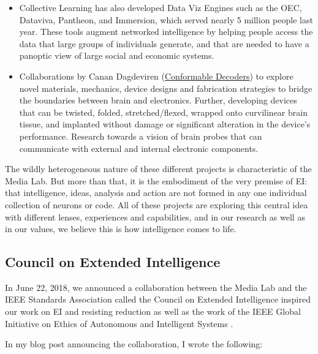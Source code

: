 \begin{itemize}
\item Collective Learning has also developed Data Viz Engines such as the OEC, Dataviva, Pantheon, and Immersion, which served nearly 5 million people last year. These tools augment networked intelligence by helping people access the data that large groups of individuals generate, and that are needed to have a panoptic view of large social and economic systems.

\item Collaborations by Canan Dagdeviren (\href{https://www.media.mit.edu/groups/conformable-decoders/overview/}{Conformable Decoders}) to explore novel materials, mechanics, device designs and fabrication strategies to bridge the boundaries between brain and electronics. Further, developing devices that can be twisted, folded, stretched/flexed, wrapped onto curvilinear brain tissue, and implanted without damage or significant alteration in the device's performance. Research towards a vision of brain probes that can communicate with external and internal electronic components.
\end{itemize}

The wildly heterogeneous nature of these different projects is characteristic of the Media Lab. But more than that, it is the embodiment of the very premise of \ac{EI}: that intelligence, ideas, analysis and action are not formed in any one individual collection of neurons or code. All of these projects are exploring this central idea with different lenses, experiences and capabilities, and in our research as well as in our values, we believe this is how intelligence comes to life.

\subsection{Council on Extended Intelligence}

In June 22, 2018, we announced a collaboration between the Media Lab and the \ac{IEEE} Standards Association called the Council on Extended Intelligence \cite{cxi2018} inspired our work on \ac{EI} and resisting reduction as well as the work of the \ac{IEEE} Global Initiative on Ethics of Autonomous and Intelligent Systems \cite{IEEEethics2018}.

In my blog post announcing the collaboration, I wrote the following:

